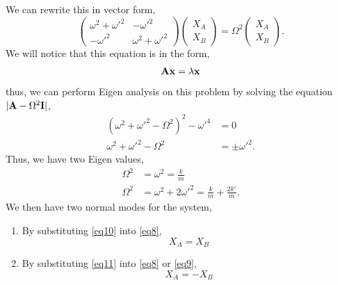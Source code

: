 \documentclass{book}
\begin{document}
We can rewrite this in vector form,
\begin{equation*}
    \begin{pmatrix}
        \omega^2 + \omega'^2 & -\omega'^2 \\
        -\omega'^2 & \omega^2 + \omega'^2
    \end{pmatrix}\begin{pmatrix}
        X_A \\ X_B
    \end{pmatrix} = \Omega^2 \begin{pmatrix}
        X_A \\ X_B
    \end{pmatrix}.
\end{equation*}
We will notice that this equation is in the form,
\begin{equation*}
    \vb{A}\vb{x} = \lambda\vb{x}
\end{equation*}
thus, we can perform Eigen analysis on this problem by solving the equation $|\vb{A} - \Omega^2\vb{I}|$,
\begin{equation*}
    \begin{split}
        (\omega^2 + \omega'^2 - \Omega^2)^2 - \omega'^4 & = 0 \\
        \omega^2 + \omega'^2 - \Omega^2 & = \pm\omega'^2. 
    \end{split}
\end{equation*}
Thus, we have two Eigen values,
\begin{align}
    \Omega^2 & = \omega^2  = \frac{k}{m} \label{eq10} \\
    \Omega^2 & = \omega^2 + 2\omega'^2 = \frac{k}{m} + \frac{2k'}{m} \label{eq11}.
\end{align}
We then have two normal modes for the system,
\begin{enumerate}
    \item By substituting \eqref{eq10} into \eqref{eq8},
    \begin{equation}
        X_A = X_B
    \end{equation}
    \item By substituting \eqref{eq11} into \eqref{eq8} or \eqref{eq9},
    \begin{equation}
        X_A = -X_B
    \end{equation}
\end{enumerate}
\end{document}
